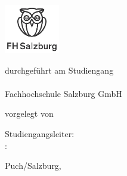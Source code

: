 %

\begin{titlepage}

\centering

\includegraphics[width=2.4cm]{frontmatter/images/fhs-logo.pdf}

\vspace*{1cm}

{%
    \Large
    \textbf{\MakeUppercase{\thesisType}}%
}
\vspace*{1cm}

{
    \Large
    \textbf{\myTitle}
}

\def\temp{\mySubtitle}
\ifx\temp\empty \else
    {
        \large
        \textbf{\mySubtitle}
    }
\fi

\vfill

    durchgeführt am Studiengang\\
    \course\\
    Fachhochschule Salzburg GmbH

\vspace*{1cm}

    vorgelegt von\\\myName

\vfill

    Studiengangsleiter: \bigboss \\[1ex]
    \supervisor: \thesupervisor

\vspace{1cm}

    Puch/Salzburg, \dateDE %

\vspace{1cm}

\end{titlepage}

